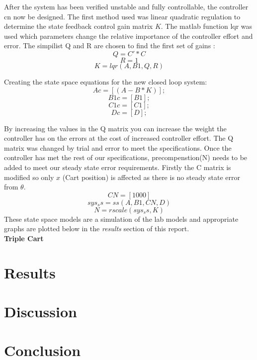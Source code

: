 \documentclass[a4paper,12pt]{article}
\begin{document}
After the system has been verified unstable and fully controllable, the controller cn now be designed. The first method used was linear quadratic regulation to determine the state feedback control gain matrix $K$. The matlab function lqr was used which parameters change the relative importance of the controller effort and error. The simpilist Q and R are chosen to find the first set of gains : $$Q = C'*C$$ $$R = 1$$ $$K = lqr(A,B1,Q,R)$$


Creating the state space equations for the new closed loop system:
$$Ac = [(A-B*K)];$$
$$B1c = [B1];$$
$$C1c = [C1];$$
$$Dc = [D];$$

By increasing the values in the Q matrix you can increase the weight the controller has on the errors at the cost of increased controller effort. The Q matrix was changed by trial and error to meet the specifications.
Once the controller has met the rest of our specifications, precompenstion(N) needs to be added to meet our steady state error requirements. Firstly the C matrix is modified so only $x$ (Cart position) is affected as there is no steady state error from $\theta$.$$CN = [1 0 0 0]$$ $$sys_ss = ss(A,B1,CN,D)$$ $$N = rscale(sys_ss,K)$$
These state space models are a simulation of the lab models and appropriate graphs are plotted below in the \emph{results} section of this report.\\
\clearpage
\noindent
\textbf{Triple Cart}\\

\section{Results}

\section{Discussion}

\section{Conclusion}
\end{document}
